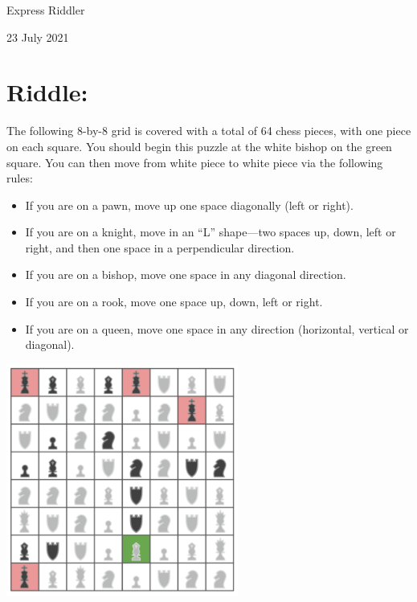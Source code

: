 \documentclass{article}
\begin{document}
\pagestyle{empty} %

\begin{center}
{\LARGE Express Riddler}

\vspace{0.15in}

{\Large 23 July 2021}
\end{center}


\section*{Riddle:}

The following 8-by-8 grid is covered with a total of 64 chess pieces, with one piece on each square.
You should begin this puzzle at the white bishop on the green square.
You can then move from white piece to white piece via the following rules:

\begin{itemize}
\item If you are on a pawn, move up one space diagonally (left or right).
\item If you are on a knight, move in an ``L'' shape---two spaces up, down, left or right, and then one space in a perpendicular direction.
\item If you are on a bishop, move one space in any diagonal direction.
\item If you are on a rook, move one space up, down, left or right.
\item If you are on a queen, move one space in any direction (horizontal, vertical or diagonal).
\end{itemize}

\begin{center}
\vspace{0.1in}
\includegraphics[width=3in]{chess.png}
\vspace{0.1in}
\end{center}
\end{document}
